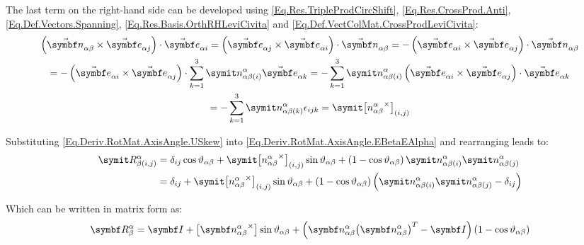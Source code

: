 The last term on the right-hand side can be developed using \eqref{Eq.Res.TripleProdCircShift}, \eqref{Eq.Res.CrossProd.Anti}, \eqref{Eq.Def.Vectors.Spanning}, \eqref{Eq.Res.Basis.OrthRHLeviCivita} and \eqref{Eq.Def.VectColMat.CrossProdLeviCivita}:
\begin{multline} \label{Eq.Deriv.RotMat.AxisAngle.USkew}
\rndp{ \varel{\rotax}{\alpha}{\beta} \times \vasub{\bv}{\alpha j}}  \cdot \vasub{\bv}{\alpha i} = \rndp{ \vasub{\bv}{\alpha j} \times \vasub{\bv}{\alpha i}}  \cdot \varel{\rotax}{\alpha}{\beta} = -\rndp{ \vasub{\bv}{\alpha i} \times \vasub{\bv}{\alpha j}}  \cdot \varel{\rotax}{\alpha}{\beta} \\
= -\rndp{ \vasub{\bv}{\alpha i} \times \vasub{\bv}{\alpha j}}  \cdot \sum_{k=1}^{3} \crelprj{\rotax}{\alpha}{\beta}{\alpha}{i} \vasub{\bv}{\alpha k} = - \sum_{k=1}^{3} \crelprj{\rotax}{\alpha}{\beta}{\alpha}{i} \rndp{ \vasub{\bv}{\alpha i} \times \vasub{\bv}{\alpha j}} \cdot \vasub{\bv}{\alpha k} \\
= -\sum_{k=1}^{3} \crelprj{\rotax}{\alpha}{\beta}{\alpha}{k} \epsilon_{ijk} = \cmp{\vskew{\relprj{\rotax}{\alpha}{\beta}{\alpha}}}{i,j}
\end{multline}

Substituting \eqref{Eq.Deriv.RotMat.AxisAngle.USkew} into \eqref{Eq.Deriv.RotMat.AxisAngle.EBetaEAlpha} and rearranging leads to:
\begin{equation}\label{Eq.Deriv.RotMat.AxisAngle.CAlphaBetaElem}
\begin{split}
\cRotM{\alpha}{\beta}{i,j} &= \delta_{ij} \cos \rel{\rotang}{\alpha}{\beta} + \cmp{\vskew{\relprj{\rotax}{\alpha}{\beta}{\alpha}}}{i,j} \sin \rel{\rotang}{\alpha}{\beta} + \rndp{1-\cos \rel{\rotang}{\alpha}{\beta}} \crelprj{\rotax}{\alpha}{\beta}{\alpha}{i} \crelprj{\rotax}{\alpha}{\beta}{\alpha}{j} \\
&=\delta_{ij} + \cmp{\vskew{\relprj{\rotax}{\alpha}{\beta}{\alpha}}}{i,j} \sin \rel{\rotang}{\alpha}{\beta} + \rndp{1-\cos \rel{\rotang}{\alpha}{\beta}} \rndp{\crelprj{\rotax}{\alpha}{\beta}{\alpha}{i} \crelprj{\rotax}{\alpha}{\beta}{\alpha}{j} - \delta_{ij}}
\end{split}
\end{equation}

Which can be written in matrix form as:
\begin{equation}\label{Eq.Deriv.RotMat.AxisAngle.CAlphaBetaTmp}
\RotM{\alpha}{\beta} = \IdM + \vskew{\vrelprj{\rotax}{\alpha}{\beta}{\alpha}} \sin \rel{\rotang}{\alpha}{\beta} + \rndp{\vrelprj{\rotax}{\alpha}{\beta}{\alpha} \trp{\vrelprj{\rotax}{\alpha}{\beta}{\alpha}} - \IdM} (1-\cos \rel{\rotang}{\alpha}{\beta})
\end{equation}

